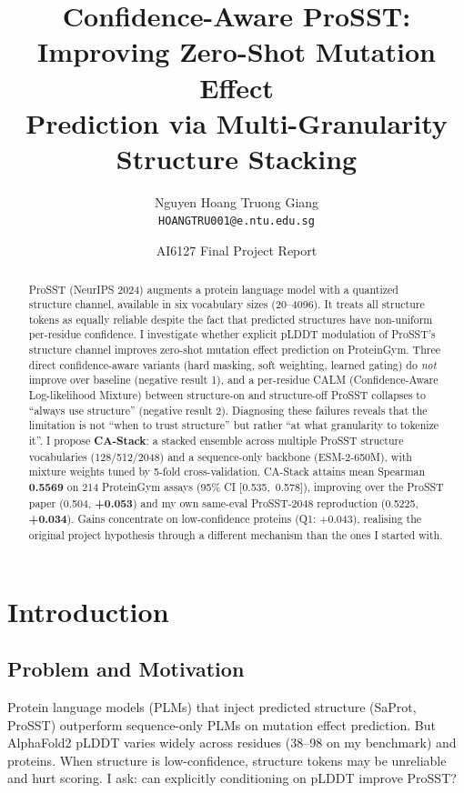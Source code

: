 \documentclass[11pt,a4paper]{article}
\title{Confidence-Aware ProSST: Improving Zero-Shot Mutation Effect\\Prediction via Multi-Granularity Structure Stacking}
\author{
    Nguyen Hoang Truong Giang\\
    \texttt{HOANGTRU001@e.ntu.edu.sg}
}
\date{AI6127 Final Project Report}
\begin{document}
\maketitle

\begin{abstract}
ProSST (NeurIPS 2024) augments a protein language model with a quantized
structure channel, available in six vocabulary sizes (20--4096). It
treats all structure tokens as equally reliable despite the fact that
predicted structures have non-uniform per-residue confidence. I
investigate whether explicit pLDDT modulation of ProSST's structure
channel improves zero-shot mutation effect prediction on ProteinGym.
Three direct confidence-aware variants (hard masking, soft weighting,
learned gating) do \emph{not} improve over baseline (negative result 1),
and a per-residue CALM (Confidence-Aware Log-likelihood Mixture) between
structure-on and structure-off ProSST collapses to ``always use
structure'' (negative result 2). Diagnosing these failures reveals that
the limitation is not ``when to trust structure'' but rather ``at what
granularity to tokenize it''. I propose \textbf{CA-Stack}: a stacked
ensemble across multiple ProSST structure vocabularies (128/512/2048)
and a sequence-only backbone (ESM-2-650M), with mixture weights tuned
by 5-fold cross-validation. CA-Stack attains mean Spearman
\textbf{0.5569} on 214 ProteinGym assays (95\% CI [0.535,~0.578]),
improving over the ProSST paper (0.504, \textbf{+0.053}) and my own
same-eval ProSST-2048 reproduction (0.5225, \textbf{+0.034}). Gains
concentrate on low-confidence proteins (Q1: $+0.043$), realising the
original project hypothesis through a different mechanism than the
ones I started with.
\end{abstract}

\section{Introduction}

\subsection{Problem and Motivation}
Protein language models (PLMs) that inject predicted structure
(SaProt, ProSST) outperform sequence-only PLMs on mutation effect
prediction. But AlphaFold2 pLDDT varies widely across residues (38--98
on my benchmark) and proteins. When structure is low-confidence,
structure tokens may be unreliable and hurt scoring. I ask: can
explicitly conditioning on pLDDT improve ProSST?
\end{document}
